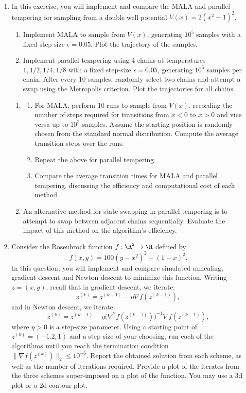 \begin{enumerate}
\item[7.2] In this exercise, you will implement and compare the MALA and parallel tempering for
sampling from a double well potential $V(x) = 2(x^2 - 1)^2$.
\begin{enumerate}
  \item Implement MALA to sample from $V(x)$, generating $10^5$ samples with a fixed
    step-size $\epsilon = 0.05$. Plot the trajectory of the samples.
  \item Implement parallel tempering using 4 chains at temperatures $1, 1/2, 1/4, 1/8$ with a
    fixed step-size $\epsilon = 0.05$, generating $10^5$ samples per chain. After every 10
    samples, randomly select two chains and attempt a swap using the Metropolis criterion. Plot
    the trajectories for all chains.
\end{enumerate}
\begin{enumerate}
  \setcounter{enumii}{0}
  \item[2.] \begin{enumerate}
    \item For MALA, perform 10 runs to sample from $V(x)$, recording the number of steps
      required for transitions from $x < 0$ to $x > 0$ and vice versa up to $10^5$ samples.
      Assume the starting position is randomly chosen from the standard normal distribution.
      Compute the average transition steps over the runs.
    \item Repeat the above for parallel tempering.
    \item Compare the average transition times for MALA and parallel tempering, discussing the
      efficiency and computational cost of each method.
  \end{enumerate}
  \item[3.] An alternative method for state swapping in parallel tempering is to attempt to swap
    between adjacent chains sequentially. Evaluate the impact of this method on the algorithm's
    efficiency.
\end{enumerate}

\item[7.3] Consider the Rosenbrock function $f : \R^2 \to \R$ defined by
\[
  f(x, y) = 100(y - x^2)^2 + (1 - x)^2.
\]
In this question, you will implement and compare simulated annealing, gradient descent and
Newton descent to minimize this function. Writing $z = (x, y)$, recall that in gradient
descent, we iterate:
\[
  z^{(k)} = z^{(k-1)} - \eta \nabla f(z^{(k-1)}),
\]
and in Newton descent, we iterate:
\[
  z^{(k)} = z^{(k-1)} - \eta\bigl(\nabla^2 f(z^{(k-1)})\bigr)^{-1} \nabla f(z^{(k-1)}),
\]
where $\eta > 0$ is a step-size parameter. Using a starting point of $z^{(0)} = (-1.2, 1)$ and
a step-size of your choosing, run each of the algorithms until you reach the termination
condition $\|\nabla f(z^{(k)})\|_2 \leq 10^{-6}$. Report the obtained solution from each
scheme, as well as the number of iterations required. Provide a plot of the iterates from the
three schemes super-imposed on a plot of the function. You may use a 3d plot or a 2d contour
plot.


\end{enumerate}
